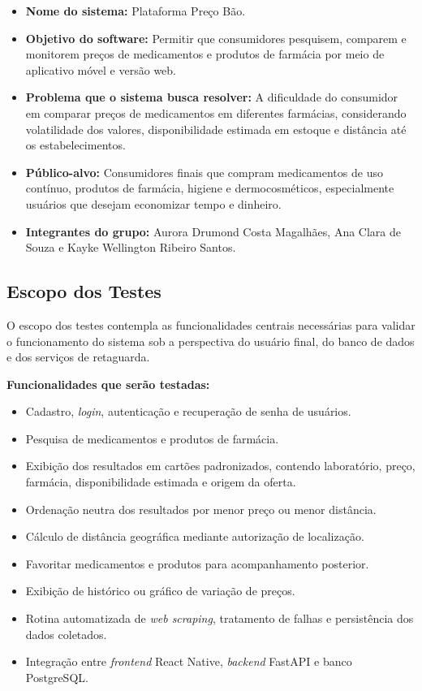 \begin{itemize}
    \item \textbf{Nome do sistema:} Plataforma Preço Bão.
    \item \textbf{Objetivo do software:} Permitir que consumidores pesquisem, comparem e monitorem preços de medicamentos e produtos de farmácia por meio de aplicativo móvel e versão web.
    \item \textbf{Problema que o sistema busca resolver:} A dificuldade do consumidor em comparar preços de medicamentos em diferentes farmácias, considerando volatilidade dos valores, disponibilidade estimada em estoque e distância até os estabelecimentos.
    \item \textbf{Público-alvo:} Consumidores finais que compram medicamentos de uso contínuo, produtos de farmácia, higiene e dermocosméticos, especialmente usuários que desejam economizar tempo e dinheiro.
    \item \textbf{Integrantes do grupo:} Aurora Drumond Costa Magalhães, Ana Clara de Souza e Kayke Wellington Ribeiro Santos.
\end{itemize}

\subsection{Escopo dos Testes} %

O escopo dos testes contempla as funcionalidades centrais necessárias para validar o funcionamento do sistema sob a perspectiva do usuário final, do banco de dados e dos serviços de retaguarda.

\textbf{Funcionalidades que serão testadas:}
\begin{itemize}
    \item Cadastro, \textit{login}, autenticação e recuperação de senha de usuários.
    \item Pesquisa de medicamentos e produtos de farmácia.
    \item Exibição dos resultados em cartões padronizados, contendo laboratório, preço, farmácia, disponibilidade estimada e origem da oferta.
    \item Ordenação neutra dos resultados por menor preço ou menor distância.
    \item Cálculo de distância geográfica mediante autorização de localização.
    \item Favoritar medicamentos e produtos para acompanhamento posterior.
    \item Exibição de histórico ou gráfico de variação de preços.
    \item Rotina automatizada de \textit{web scraping}, tratamento de falhas e persistência dos dados coletados.
    \item Integração entre \textit{frontend} React Native, \textit{backend} FastAPI e banco PostgreSQL.
\end{itemize}

